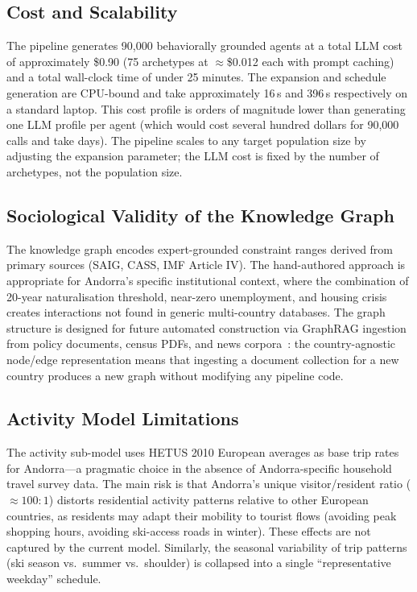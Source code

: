 \documentclass[sustainability,article,submit,pdftex,moreauthors]{Definitions/mdpi}
\begin{document}
\subsection{Cost and Scalability}
\label{subsec:scalability}

The pipeline generates 90,000 behaviorally grounded agents at a total LLM
cost of approximately \$0.90 (75 archetypes at $\approx$\$0.012 each with
prompt caching) and a total wall-clock time of under 25 minutes. The
expansion and schedule generation are CPU-bound and take approximately
16\,s and 396\,s respectively on a standard laptop. This cost profile is
orders of magnitude lower than generating one LLM profile per agent
(which would cost several hundred dollars for 90,000 calls and take
days). The pipeline scales to any target population size by adjusting
the expansion parameter; the LLM cost is fixed by the number of
archetypes, not the population size.

\subsection{Sociological Validity of the Knowledge Graph}
\label{subsec:kg_validity}

The knowledge graph encodes expert-grounded constraint ranges derived from
primary sources (SAIG, CASS, IMF Article IV). The hand-authored approach
is appropriate for Andorra's specific institutional context, where the
combination of 20-year naturalisation threshold, near-zero unemployment,
and housing crisis creates interactions not found in generic multi-country
databases. The graph structure is designed for future automated construction
via GraphRAG ingestion from policy documents, census PDFs, and news
corpora~\cite{pan2023unifying}: the country-agnostic node/edge representation
means that ingesting a document collection for a new country produces a
new graph without modifying any pipeline code.

\subsection{Activity Model Limitations}
\label{subsec:activity_limitations}

The activity sub-model uses HETUS 2010 European averages as base trip
rates for Andorra---a pragmatic choice in the absence of Andorra-specific
household travel survey data. The main risk is that Andorra's unique
visitor/resident ratio ($\approx 100:1$) distorts residential activity
patterns relative to other European countries, as residents may adapt
their mobility to tourist flows (avoiding peak shopping hours, avoiding
ski-access roads in winter). These effects are not captured by the current
model. Similarly, the seasonal variability of trip patterns (ski season
vs.\ summer vs.\ shoulder) is collapsed into a single ``representative
weekday'' schedule.
\end{document}
